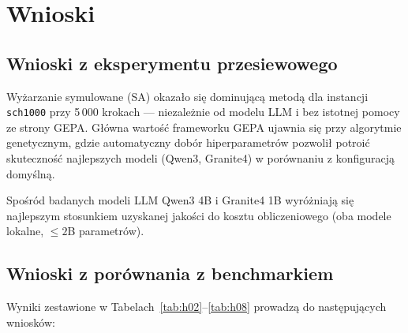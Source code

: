 \documentclass[11pt,a4paper]{article}
\begin{document}
\section{Wnioski}

\subsection{Wnioski z eksperymentu przesiewowego}

Wyżarzanie symulowane (SA) okazało się dominującą metodą dla instancji
\texttt{sch1000} przy 5\,000 krokach — niezależnie od modelu LLM i bez
istotnej pomocy ze strony GEPA.
Główna wartość frameworku GEPA ujawnia się przy algorytmie genetycznym,
gdzie automatyczny dobór hiperparametrów pozwolił potroić skuteczność
najlepszych modeli (Qwen3, Granite4) w porównaniu z konfiguracją domyślną.

Spośród badanych modeli LLM Qwen3 4B i Granite4 1B wyróżniają się najlepszym
stosunkiem uzyskanej jakości do kosztu obliczeniowego (oba modele lokalne,
$\leq 2$B parametrów).

\subsection{Wnioski z porównania z benchmarkiem}

Wyniki zestawione w Tabelach~\ref{tab:h02}--\ref{tab:h08} prowadzą do
następujących wniosków:
\end{document}
